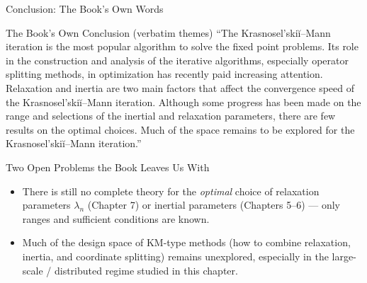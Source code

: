 \documentclass[aspectratio=169,10pt]{beamer}
\begin{document}
\begin{frame}{Conclusion: The Book's Own Words}

\begin{block}{The Book's Own Conclusion (verbatim themes)}
``The Krasnosel'ski\u{i}--Mann iteration is the most popular algorithm to solve the fixed point problems. Its role in the construction and analysis of the iterative algorithms, especially operator splitting methods, in optimization has recently paid increasing attention. Relaxation and inertia are two main factors that affect the convergence speed of the Krasnosel'ski\u{i}--Mann iteration. Although some progress has been made on the range and selections of the inertial and relaxation parameters, there are few results on the optimal choices. Much of the space remains to be explored for the Krasnosel'ski\u{i}--Mann iteration.''
\end{block}

\begin{alertblock}{Two Open Problems the Book Leaves Us With}
\begin{itemize}
  \item There is still no complete theory for the \emph{optimal} choice of relaxation parameters $\lambda_n$ (Chapter 7) or inertial parameters (Chapters 5--6) --- only ranges and sufficient conditions are known.
  \item Much of the design space of KM-type methods (how to combine relaxation, inertia, and coordinate splitting) remains unexplored, especially in the large-scale / distributed regime studied in this chapter.
\end{itemize}
\end{alertblock}

\end{frame}
\end{document}
